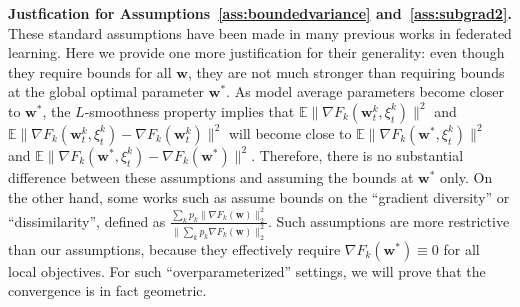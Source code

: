 \textbf{Justfication for Assumptions~\ref{ass:boundedvariance} and~\ref{ass:subgrad2}.} These standard assumptions have been made in many previous
works in federated learning\cite{yu2019parallel,li2019convergence,stich2018local}. Here we provide one more justification
for their generality: even though they require bounds for all $\mathbf{w}$,
they are not much stronger than requiring bounds at the global optimal
parameter $\mathbf{w}^{\ast}$. As model average parameters become
closer to $\mathbf{w}^{\ast}$, the $L$-smoothness property implies
that $\mathbb{E}\|\nabla F_{k}(\mathbf{w}_{t}^{k},\xi_{t}^{k})\|^{2}$
and $\mathbb{E}\|\nabla F_{k}(\mathbf{w}_{t}^{k},\xi_{t}^{k})-\nabla F_{k}(\mathbf{w}_{t}^{k})\|^{2}$
will become close to $\mathbb{E}\|\nabla F_{k}(\mathbf{w}^{\ast},\xi_{t}^{k})\|^{2}$
and $\mathbb{E}\|\nabla F_{k}(\mathbf{w}^{\ast},\xi_{t}^{k})-\nabla F_{k}(\mathbf{w}^{\ast})\|^{2}$.
Therefore, there is no substantial difference between these assumptions
and assuming the bounds at $\mathbf{w}^{\ast}$ only. On the other
hand, some works such as \cite{haddadpour2019convergence,li2018federated}
assume bounds on the ``gradient diversity'' or ``dissimilarity'',
defined as $\frac{\sum_{k}p_{k}\|\nabla F_{k}(\mathbf{w})\|_{2}^{2}}{\|\sum_{k}p_{k}\nabla F_{k}(\mathbf{w})\|_{2}^{2}}$.
Such assumptions are more restrictive than our assumptions, because
they effectively require $\nabla F_{k}(\mathbf{w}^{\ast})\equiv0$ for all local
objectives. For such ``overparameterized'' settings, we will prove
that the convergence is in fact geometric. 

